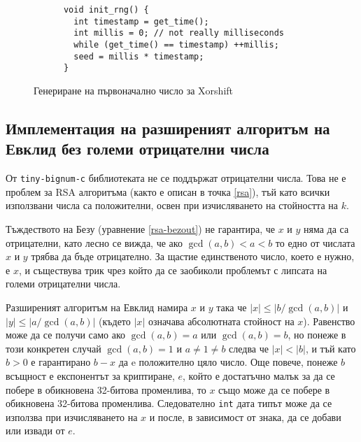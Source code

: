   \begin{figure}[ht]
    \centering
    \caption{Генериране на първоначално число за Xorshift}
    \begin{verbatim}
      void init_rng() {
        int timestamp = get_time();
        int millis = 0; // not really milliseconds
        while (get_time() == timestamp) ++millis;
        seed = millis * timestamp;
      }
    \end{verbatim}
    \label{fig:seed-generation}
  \end{figure}

  \subsection{Имплементация на разширеният алгоритъм на Евклид без големи отрицателни числа}
  От {\tt tiny-bignum-c} библиотеката не се поддържат отрицателни числа. Това не е проблем за RSA алгоритъма (както е описан в точка \ref{rsa}), тъй като всички използвани числа са положителни, освен при изчисляването на стойността на $k$.

  Тъждеството на Безу (уравнение \ref{rsa-bezout}) не гарантира, че $x$ и $y$ няма да са отрицателни, като лесно се вижда, че ако $\gcd(a,b) < a < b$ то едно от числата $x$ и $y$ трябва да бъде отрицателно. За щастие единственото число, което е нужно, е $x$, и съществува трик чрез който да се заобиколи проблемът с липсата на големи отрицателни числа.

  Разширеният алгоритъм на Евклид намира $x$ и $y$ така че $|x|\leq|b/\gcd(a,b)|$ и $|y|\leq|a/\gcd(a,b)|$ (където $|x|$ означава абсолютната стойност на $x$). Равенство може да се получи само ако $\gcd(a,b)=a$ или $\gcd(a,b)=b$, но понеже в този конкретен случай $\gcd(a,b)=1$ и $a \neq 1 \neq b$ следва че $|x|<|b|$, и тъй като $b>0$ е гарантирано $b-x$ да e положително цяло число.
  Още повече, понеже $b$ всъщност е експонентът за криптиране, $e$, който е достатъчно малък за да се побере в обикновена 32-битова променлива, то $x$ също може да се побере в обикновена 32-битова променлива. Следователно {\tt int} дата типът може да се използва при изчисляването на $x$ и после, в зависимост от знака, да се добави или извади от $e$.

